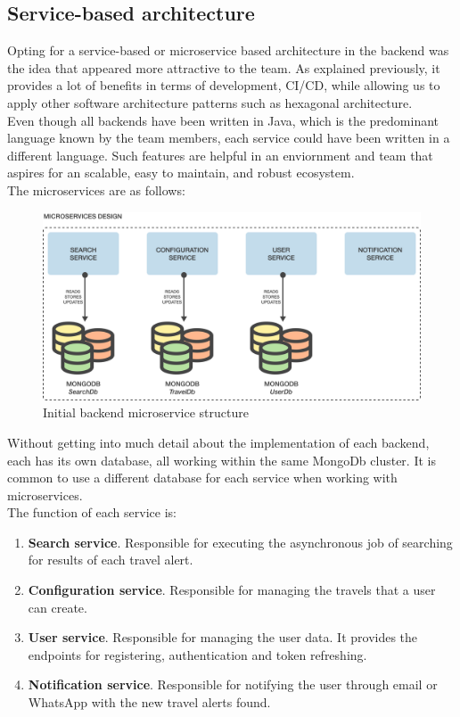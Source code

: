 \documentclass[./chapters/design.tex]{subfiles}
\begin{document}
\subsection{Service-based architecture}
Opting for a service-based or microservice based architecture in the backend was
the idea that appeared more attractive to the team. As explained previously, it
provides a lot of benefits in terms of development, CI/CD, while allowing us to
apply other software architecture patterns such as hexagonal architecture.
\\
Even though all backends have been written in Java, which is the predominant
language known by the team members, each service could have been written in a
different language. Such features are helpful in an enviornment and team that
aspires for an scalable, easy to maintain, and robust ecosystem.
\\[8pt]
The microservices are as follows:
\begin{figure}[H]
	\centering
	\includegraphics[width=\textwidth]{./assets/microservice-struct.png}
	\caption{Initial backend microservice structure}
\end{figure}
Without getting into much detail about the implementation of each backend, each
has its own database, all working within the same MongoDb cluster. It is common
to use a different database for each service when working with microservices.
\\
The function of each service is:
\begin{enumerate}[label = -]
	\item\textbf{Search service}. Responsible for executing the asynchronous job
	of searching for results of each travel alert.
	\item\textbf{Configuration service}. Responsible for managing the travels that
	a user can create.
	\item\textbf{User service}. Responsible for managing the user data. It
	provides the endpoints for registering, authentication and token refreshing.
	\item\textbf{Notification service}. Responsible for notifying the user through
	email or WhatsApp with the new travel alerts found.
\end{enumerate}
\end{document}
